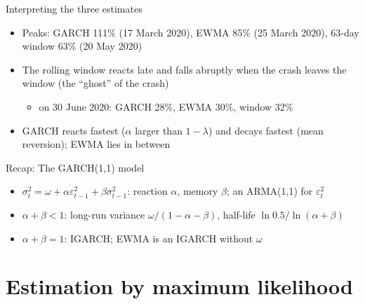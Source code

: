 \begin{frame}{Interpreting the three estimates}
\itemsize{\small}
\begin{itemize}
    \item Peaks: GARCH 111\% (17 March 2020), EWMA 85\% (25 March 2020), 63-day window 63\% (20 May 2020)
    \item The rolling window reacts late and falls abruptly when the crash leaves the window (the ``ghost'' of the crash)
    \begin{itemize}
        \item on 30 June 2020: GARCH 28\%, EWMA 30\%, window 32\%
    \end{itemize}
    \item GARCH reacts fastest ($\alpha$ larger than $1 - \lambda$) and decays fastest (mean reversion); EWMA lies in between
\end{itemize}
\end{frame}

\begin{frame}{Recap: The GARCH(1,1) model}
\itemsize{\small}
\begin{itemize}
    \item $\sigma_t^2 = \omega + \alpha\varepsilon_{t-1}^2 + \beta\sigma_{t-1}^2$: reaction $\alpha$, memory $\beta$; an ARMA(1,1) for $\varepsilon_t^2$
    \item $\alpha + \beta < 1$: long-run variance $\omega/(1 - \alpha - \beta)$, half-life $\ln 0.5/\ln(\alpha + \beta)$
    \item $\alpha + \beta = 1$: IGARCH; EWMA is an IGARCH without $\omega$
\end{itemize}
\end{frame}


\section{Estimation by maximum likelihood}

